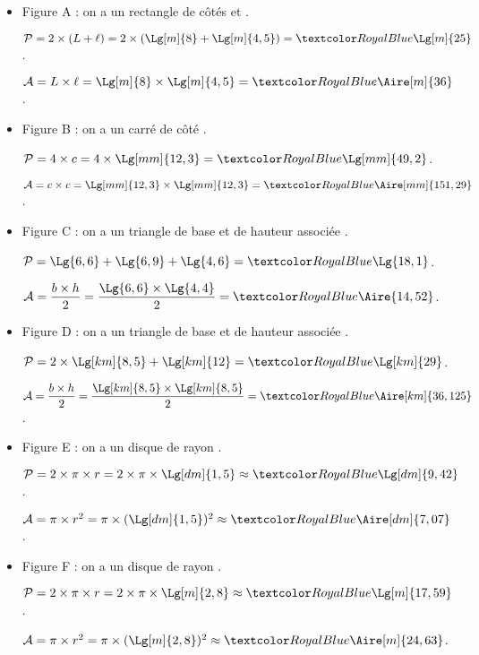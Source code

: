 \begin{Maquette}[Fiche,CorrigeFin,Colonnes=2]{}
\begin{multicols}{2}
         \begin{Solution}
            \begin{itemize}
               \item Figure A : on a un rectangle de côtés  et . \par
                  $\mathcal{P} =2\times(L+\ell) =2\times(\Lg[m]{8}+\Lg[m]{4,5}) =\cor{\Lg[m]{25}}$. \par
                  $\mathcal{A} =L\times\ell =\Lg[m]{8}\times\Lg[m]{4,5} =\cor{\Aire[m]{36}}$. \par
               \item Figure B : on a un carré de côté . \par
                  $\mathcal{P} =4\times c =4\times\Lg[mm]{12,3} =\cor{\Lg[mm]{49,2}}$. \par
                  $\mathcal{A} =c\times c =\Lg[mm]{12,3}\times\Lg[mm]{12,3} =\cor{\Aire[mm]{151,29}}$. \par 
               \item Figure C : on a un triangle de base  et de hauteur associée . \par
                  $\mathcal{P} =\Lg{6,6}+\Lg{6,9}+\Lg{4,6} =\cor{\Lg{18,1}}$. \par \smallskip
                  $\mathcal{A} =\dfrac{b\times h}{2} =\dfrac{\Lg{6,6}\times\Lg{4,4}}{2} =\cor{\Aire{14,52}}$. \par \smallskip
               \item Figure D : on a un triangle de base  et de hauteur associée . \par
                  $\mathcal{P} =2\times\Lg[km]{8,5}+\Lg[km]{12} =\cor{\Lg[km]{29}}$. \par \smallskip
                  $\mathcal{A} =\dfrac{b\times h}{2}  =\dfrac{\Lg[km]{8,5}\times\Lg[km]{8,5}}{2}=\cor{\Aire[km]{36,125}}$. \par \smallskip
               \item  Figure E : on a un disque de rayon . \par
                  $\mathcal{P} =2\times\pi\times r =2\times\pi\times\Lg[dm]{1,5} \approx\cor{\Lg[dm]{9,42}}$. \par
                  $\mathcal{A} =\pi\times r^2 =\pi\times(\Lg[dm]{1,5})^2 \approx\cor{\Aire[dm]{7,07}}$. \par
               \item  Figure F : on a un disque de rayon . \par
                  $\mathcal{P} =2\times\pi\times r =2\times\pi\times\Lg[m]{2,8} \approx\cor{\Lg[m]{17,59}}$. \par
                  $\mathcal{A} =\pi\times r^2 =\pi\times(\Lg[m]{2,8})^2 \approx\cor{\Aire[m]{24,63}}$.
            \end{itemize}     
         \end{Solution}
         

\end{multicols}
\end{Maquette}
